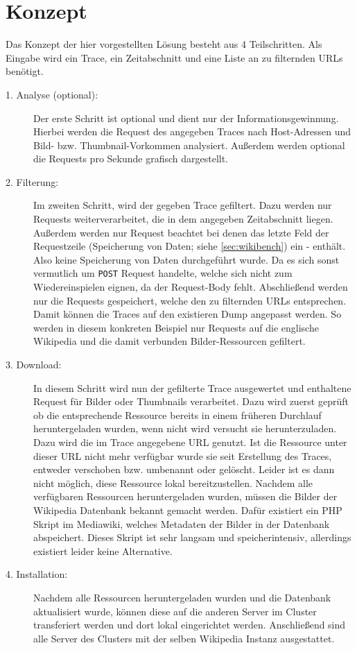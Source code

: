 \section{Konzept}
\label{sec:konzept}

Das Konzept der hier vorgestellten Lösung besteht aus 4 Teilschritten. Als Eingabe wird ein Trace, ein Zeitabschnitt und eine Liste an zu filternden URLs benötigt.

\begin{description}
\item[1. Analyse (optional):] Der erste Schritt ist optional und dient nur der Informationsgewinnung. Hierbei werden die Request des angegeben Traces nach Host-Adressen und Bild- bzw. Thumbnail-Vorkommen analysiert. Außerdem werden optional die Requests pro Sekunde grafisch dargestellt.
\item[2. Filterung:] Im zweiten Schritt, wird der gegeben Trace gefiltert. Dazu werden nur Requests weiterverarbeitet, die in dem angegeben Zeitabschnitt liegen. Außerdem werden nur Request beachtet bei denen das letzte Feld der Requestzeile (Speicherung von Daten; siehe \ref{sec:wikibench}) ein \glqq{}-\grqq{} enthält. Also keine Speicherung von Daten durchgeführt wurde. Da es sich sonst vermutlich um \texttt{POST} Request handelte, welche sich nicht zum Wiedereinspielen eignen, da der Request-Body fehlt. Abschließend werden nur die Requests gespeichert, welche den zu filternden URLs entsprechen. Damit können die Traces auf den existieren Dump angepasst werden. So werden in diesem konkreten Beispiel nur Requests auf die englische Wikipedia und die damit verbunden Bilder-Ressourcen gefiltert.
\item[3. Download:] In diesem Schritt wird nun der gefilterte Trace ausgewertet und enthaltene Request für Bilder oder Thumbnails verarbeitet. Dazu wird zuerst geprüft ob die entsprechende Ressource bereits in einem früheren Durchlauf heruntergeladen wurden, wenn nicht wird versucht sie herunterzuladen. Dazu wird die im Trace angegebene URL genutzt. Ist die Ressource unter dieser URL nicht mehr verfügbar wurde sie seit Erstellung des Traces, entweder verschoben bzw. umbenannt oder gelöscht. Leider ist es dann nicht möglich, diese Ressource lokal bereitzustellen. Nachdem alle verfügbaren Ressourcen heruntergeladen wurden, müssen die Bilder der Wikipedia Datenbank bekannt gemacht werden. Dafür existiert ein PHP Skript im Mediawiki, welches Metadaten der Bilder in der Datenbank abspeichert. Dieses Skript ist sehr langsam und speicherintensiv, allerdings existiert leider keine Alternative.
\item[4. Installation:] Nachdem alle Ressourcen heruntergeladen wurden und die Datenbank aktualisiert wurde, können diese auf die anderen Server im Cluster transferiert werden und dort lokal eingerichtet werden. Anschließend sind alle Server des Clusters mit der selben Wikipedia Instanz ausgestattet.
\end{description}
